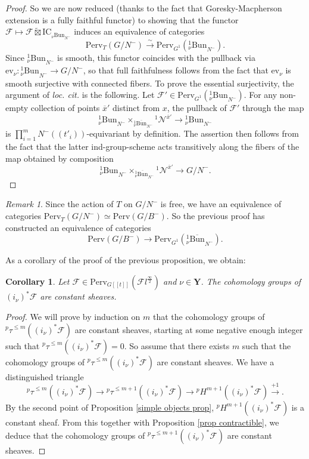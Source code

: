 \documentclass[11pt]{amsart}
\theoremstyle{plain}
\newtheorem{coro}[thm]{Corollary}
\theoremstyle{remark}
\newtheorem{rem}[thm]{Remark}
\numberwithin{equation}{section}
\begin{document}
\begin{proof}
		So we are now reduced (thanks to the fact that Goresky-Macpherson extension is a fully faithful functor) to showing that the functor $\mathcal{F}\mapsto \mathcal{F}\widetilde{\boxtimes}\mathrm{IC}_{{_{\nu}\mathrm{Bun}}_{N^-}}$ induces an equivalence of categories
		$$\mathrm{Perv}_T(G/N^-)\xrightarrow{\sim}  \mathrm{Perv}_{G^1}({_\nu^1\mathrm{Bun}}_{N^-}).$$
		Since ${_\nu^1\mathrm{Bun}}_{N^-}$ is smooth, this functor coincides with the pullback via $\mathrm{ev}_\nu: {_\nu^1\mathrm{Bun}}_{N^-}\to G/N^-$, so that full faithfulness follows from the fact that $\mathrm{ev}_\nu$ is smooth surjective with connected fibers. To prove the essential surjectivity, the argument of \textit{loc. cit.} is the following. Let $\mathcal{F}'\in \mathrm{Perv}_{G^1}({_\nu^1\mathrm{Bun}}_{N^-})$. For any non-empty collection of points $\overline{x}'$ distinct from $x$, the pullback of $\mathcal{F}'$ through the map 
		$${_\nu^1\mathrm{Bun}}_{N^-}\times_{{_\nu^1\overline{\mathrm{Bun}}}_{N^-}} {^1\mathcal{N}^{\overline{x}'}}\to {_\nu^1\mathrm{Bun}}_{N^-}$$
		is $\prod_{i=1}^mN^-((t'_i))$-equivariant by definition. The assertion then follows from the fact that the latter ind-group-scheme acts transitively along the fibers of the map obtained by composition
		$${_\nu^1\mathrm{Bun}}_{N^-}\times_{{_\nu^1\overline{\mathrm{Bun}}}_{N^-}} {^1\mathcal{N}^{\overline{x}'}}\to G/N^-. $$
	\end{proof}
	\begin{rem}\label{remark G/B}
		Since the action of $T$ on $G/N^-$ is free, we have an equivalence of categories $\mathrm{Perv}_T(G/N^-)\simeq \mathrm{Perv}(G/B^-)$. So the previous proof has constructed an equivalence of categories
		$$\mathrm{Perv}(G/B^-)\to  \mathrm{Perv}_{G^1}({_\nu^1\overline{\mathrm{Bun}}}_{N^-}).$$
	\end{rem}
	As a corollary of the proof of the previous proposition, we obtain:
	\begin{coro}\label{coro constructible}
		Let $\mathcal{F}\in \mathrm{Perv}_{G[[t]]}(\mathcal{F}l^{\frac{\infty}{2}})$ and $\nu\in\mathbf{Y}$. The cohomology groups of $(i_\nu)^*\mathcal{F}$ are constant sheaves.
	\end{coro}
	\begin{proof}
	We will prove by induction on $m$ that the cohomology groups of ${^p\tau}^{\leq m}((i_\nu)^*\mathcal{F})$ are constant sheaves, starting at some negative enough integer such that ${^p\tau}^{\leq m}((i_\nu)^*\mathcal{F})=0$. So assume that there exists $m$ such that the cohomology groups of ${^p\tau}^{\leq m}((i_\nu)^*\mathcal{F})$ are constant sheaves. We have a distinguished triangle
		$${^p\tau}^{\leq m}((i_\nu)^*\mathcal{F})\to {^p\tau}^{\leq m+1}((i_\nu)^*\mathcal{F})\to {^pH}^{m+1}((i_\nu)^*\mathcal{F})\xrightarrow{+1}{}. $$
		By the second point of Proposition \ref{simple objects prop}, ${^pH}^{m+1}((i_\nu)^*\mathcal{F})$ is a constant sheaf. From this together with Proposition \ref{prop contractible}, we deduce that the cohomology groups of ${^p\tau}^{\leq m+1}((i_\nu)^*\mathcal{F})$ are constant sheaves.
	\end{proof}
\end{document}
